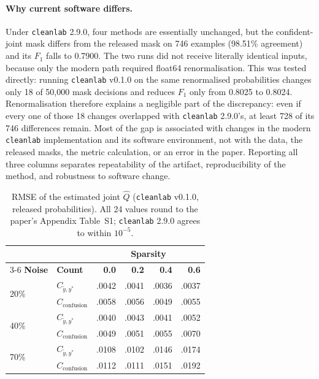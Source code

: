 \documentclass[11pt]{article}
\newcommand{\cleanlab}{\texttt{cleanlab}}
\begin{document}
\paragraph{Why current software differs.} Under \cleanlab{} 2.9.0, four
methods are essentially unchanged, but the confident-joint mask differs from
the released mask on 746 examples (98.51\% agreement) and its $F_1$ falls to
0.7900. The two runs did not receive literally identical inputs, because only
the modern path required float64 renormalisation. This was tested directly:
running \cleanlab{} v0.1.0 on the same renormalised probabilities changes
only 18 of 50,000 mask decisions and reduces $F_1$ only from 0.8025 to
0.8024. Renormalisation therefore explains a negligible part of the
discrepancy: even if every one of those 18 changes overlapped with
\cleanlab{} 2.9.0's, at least 728 of its 746 differences remain. Most of the
gap is associated with changes in the modern \cleanlab{} implementation and
its software environment, not with the data, the released masks, the metric
calculation, or an error in the paper. Reporting all three columns separates repeatability of the artifact,
reproducibility of the method, and robustness to software change.

\begin{table}[t]
\centering
\small
\setlength{\tabcolsep}{4pt}
\begin{tabular}{llrrrr}
\toprule
 & & \multicolumn{4}{c}{\textbf{Sparsity}} \\
\cmidrule(l){3-6}
\textbf{Noise} & \textbf{Count} & \textbf{0.0} & \textbf{0.2} & \textbf{0.4} & \textbf{0.6} \\
\midrule
\multirow{2}{*}{20\%} & $C_{\tilde{y},y^*}$ & .0042 & .0041 & .0036 & .0037 \\
 & $C_{\text{confusion}}$ & .0058 & .0056 & .0049 & .0055 \\
\multirow{2}{*}{40\%} & $C_{\tilde{y},y^*}$ & .0040 & .0043 & .0041 & .0052 \\
 & $C_{\text{confusion}}$ & .0049 & .0051 & .0055 & .0070 \\
\multirow{2}{*}{70\%} & $C_{\tilde{y},y^*}$ & .0108 & .0102 & .0146 & .0174 \\
 & $C_{\text{confusion}}$ & .0112 & .0111 & .0151 & .0192 \\
\bottomrule
\end{tabular}
\caption{RMSE of the estimated joint $\hat{Q}$ (\cleanlab{} v0.1.0, released
probabilities). All 24 values round to the paper's Appendix Table~S1;
\cleanlab{} 2.9.0 agrees to within $10^{-5}$.}
\label{tab:rmse}
\end{table}
\end{document}
